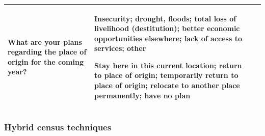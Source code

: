 \documentclass[
]{article}
\begin{document}
\begin{longtable}[]{@{}llll@{}}
\begin{minipage}[t]{0.22\columnwidth}
What are your
plans regarding
the place of
origin for the
coming year?\strut
\end{minipage} & \begin{minipage}[t]{0.22\columnwidth}\raggedright
Insecurity;
drought,
floods; total
loss of
livelihood
(destitution);
better economic
opportunities
elsewhere; lack
of access to
services; other

Stay here in
this current
location;
return to place
of origin;
temporarily
return to place
of origin;
relocate to
another place
permanently;
have no plan\strut
\end{minipage}\tabularnewline
\bottomrule
\end{longtable}

\hypertarget{section-1}{%
\paragraph{}\label{section-1}}

\hypertarget{a.4.-hybrid-census-techniques}{%
\subsubsection{Hybrid census techniques}\label{a.4.-hybrid-census-techniques}}
\end{document}
